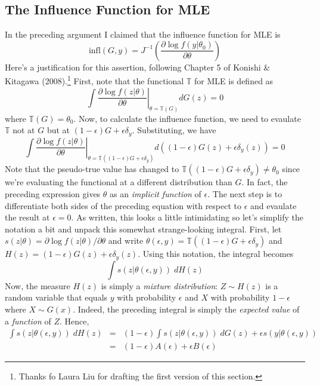 \subsection{The Influence Function for MLE}
In the preceding argument I claimed that the influence function for MLE is 
	$$\mbox{infl}(G,y) = J^{-1} \left(\frac{\partial \log f(y|\theta_0)}{\partial \theta}\right)$$
  Here's a justification for this assertion, following Chapter 5 of Konishi \& Kitagawa (2008).\footnote{Thanks fo Laura Liu for drafting the first version of this section.} 
First, note that the functional $\mathbb{T}$ for MLE is defined as
$$\int\left.\frac{\partial\log f\left(z|\theta\right)}{\partial\theta}\right|_{\theta=\mathbb{T}\left(G\right)}dG\left(z\right)=0$$
where $\mathbb{T}\left(G\right)=\theta_{0}$. 
Now, to calculate the influence function, we need to evaulate $\mathbb{T}$ not at $G$ but at $\left(1-\epsilon\right)G+\epsilon\delta_{y}$. 
Substituting, we have
$$\int\left.\frac{\partial\log f\left(z|\theta\right)}{\partial\theta}\right|_{\theta=\mathbb{T}\left(\left(1-\epsilon\right)G+\epsilon\delta_{y}\right)}d\left(\left(1-\epsilon\right)G\left(z\right)+\epsilon\delta_{y}\left(z\right)\right)=0$$
Note that the pseudo-true value has changed to $\mathbb{T}(\left(1-\epsilon\right)G+\epsilon\delta_{y}) \neq \theta_0$ since we're evaluating the functional at a different distribution than $G$. In fact, the preceding expression gives $\theta$ as an \emph{implicit function} of $\epsilon$. The next step is to differentiate both sides of the preceding equation with respect to $\epsilon$ and evaulate the result at $\epsilon = 0$. As written, this looks a little intimidating so let's simplify the notation a bit and unpack this somewhat strange-looking integral. First, let $s(z| \theta) = \partial \log f(z|\theta)/\partial \theta$ and write $\theta(\epsilon,y) = \mathbb{T}(\left(1-\epsilon\right)G+\epsilon\delta_{y})$ and $H(z) = \left(1-\epsilon\right)G\left(z\right)+\epsilon\delta_{y}\left(z\right)$. Using this notation, the integral becomes
	$$\int s(z|\theta(\epsilon,y))\; dH(z)$$
Now, the measure $H(z)$ is simply a \emph{mixture distribution}: $Z \sim H(z)$ is a random variable that equals $y$ with probability $\epsilon$ and $X$ with probability $1-\epsilon$ where $X \sim G(x)$. Indeed, the preceding integral is simply the \emph{expected value} of a \emph{function} of $Z$. Hence,
\begin{eqnarray*}
	\int s(z|\theta(\epsilon,y))\; dH(z) &=& (1-\epsilon)\int s(z|\theta(\epsilon,y))\; dG(z) + \epsilon s(y|\theta(\epsilon,y))\\
		&=& (1-\epsilon) A(\epsilon) + \epsilon B(\epsilon)
\end{eqnarray*}
